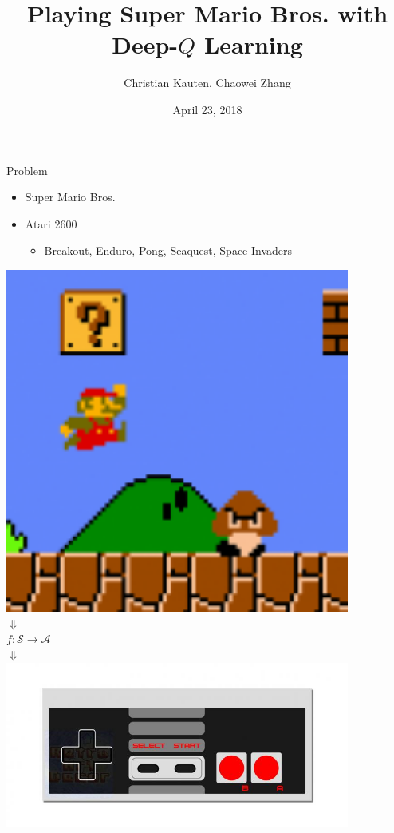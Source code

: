 \documentclass{beamer}
\title{Playing Super Mario Bros. with Deep-$Q$ Learning}
\author{Christian Kauten, Chaowei Zhang}
\institute{Auburn University}
\date{April 23, 2018}
\begin{document}
\frame{\titlepage}

\begin{frame}{Problem}
\begin{minipage}{\textwidth}
%
\begin{minipage}{0.5\textwidth}
\begin{itemize}
    \item{Super Mario Bros.}
    \item{Atari 2600}
    \begin{itemize}
    \item{Breakout, Enduro, Pong, Seaquest, Space Invaders}
    \end{itemize}
\end{itemize}
\end{minipage}
\hfill
\begin{minipage}[t]{0.5\textwidth}
\centering
\includegraphics[width=0.85\textwidth]{img/smb} \\
$\Downarrow$ \\
$f : \mathcal{S} \to \mathcal{A}$ \\
$\Downarrow$ \\
\includegraphics[width=0.85\textwidth]{img/nes}
\end{minipage}
%
\end{minipage}
\end{frame}
\end{document}
